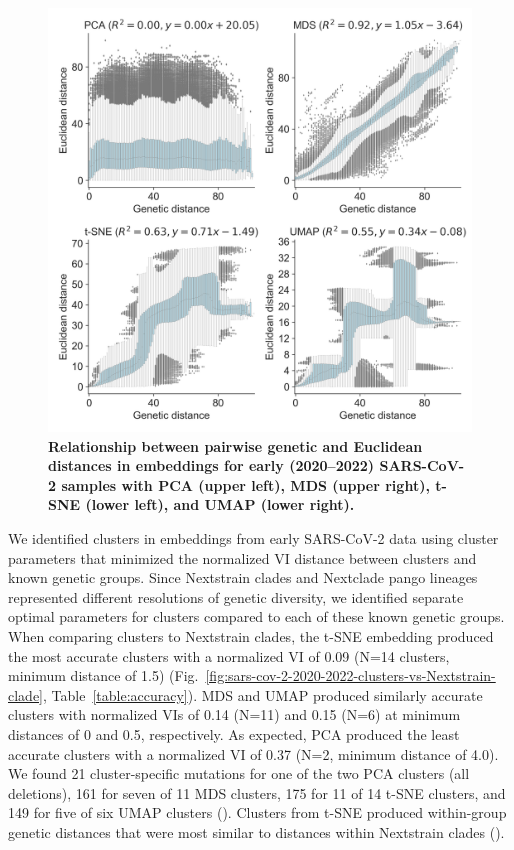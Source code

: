 \documentclass[10pt,letterpaper]{article}
\begin{document}
\begin{figure}[!h]
\includegraphics[width=\columnwidth]{figures/sarscov2-euclidean-distance-by-genetic-distance.png}
\caption{{\bf Relationship between pairwise genetic and Euclidean distances in embeddings for early (2020--2022) SARS-CoV-2 samples with PCA (upper left), MDS (upper right), t-SNE (lower left), and UMAP (lower right).}}
\label{fig:sars-cov-2-pairwise-distances}
\end{figure}

We identified clusters in embeddings from early SARS-CoV-2 data using cluster parameters that minimized the normalized VI distance between clusters and known genetic groups.
Since Nextstrain clades and Nextclade pango lineages represented different resolutions of genetic diversity, we identified separate optimal parameters for clusters compared to each of these known genetic groups.
When comparing clusters to Nextstrain clades, the t-SNE embedding produced the most accurate clusters with a normalized VI of 0.09 (N=14 clusters, minimum distance of 1.5) (Fig.~\ref{fig:sars-cov-2-2020-2022-clusters-vs-Nextstrain-clade}, Table~\ref{table:accuracy}).
MDS and UMAP produced similarly accurate clusters with normalized VIs of 0.14 (N=11) and 0.15 (N=6) at minimum distances of 0 and 0.5, respectively.
As expected, PCA produced the least accurate clusters with a normalized VI of 0.37 (N=2, minimum distance of 4.0).
We found 21 cluster-specific mutations for one of the two PCA clusters (all deletions), 161 for seven of 11 MDS clusters, 175 for 11 of 14 t-SNE clusters, and 149 for five of six UMAP clusters ().
Clusters from t-SNE produced within-group genetic distances that were most similar to distances within Nextstrain clades ().
\end{document}
